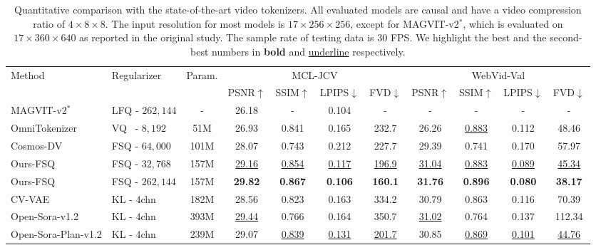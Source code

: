 \documentclass{article} %
\begin{document}
\begin{table}[t]
\begin{center}
\footnotesize
\caption{Quantitative comparison with the state-of-the-art video tokenizers.
All evaluated models are causal and have a video compression ratio of $4\times 8\times 8$.
The input resolution for most models is $17 \times 256 \times 256$, except for MAGVIT-v2$^*$, which is evaluated on $17 \times 360 \times 640$ as reported in the original study.
The sample rate of testing data is 30 FPS.
We highlight the best and the second-best numbers in \textbf{bold} and \underline{underline} respectively.
}
    \setlength\tabcolsep{3pt}
    \renewcommand\arraystretch{1.1}
    \begin{tabular}{l|l|c|cccc|cccc}
    \toprule[1.5pt]
    \multirow{2}{*}{Method} & \multirow{2}{*}{Regularizer}  & \multirow{2}{*}{Param.}  & \multicolumn{4}{c}{MCL-JCV} & \multicolumn{4}{c}{WebVid-Val} \\
    \cmidrule(l){4-7}
    \cmidrule(l){8-11}
     &   &  & PSNR$\uparrow$ & SSIM$\uparrow$ & LPIPS$\downarrow$ & FVD$\downarrow$ & PSNR$\uparrow$ & SSIM$\uparrow$ & LPIPS$\downarrow$ & FVD$\downarrow$ \\
    \midrule 
    MAGVIT-v2$^*$  & LFQ - $262,144$   & - & 26.18 & - & 0.104 &-&-&- &-&- \\
    OmniTokenizer & VQ \, - $8,192$ & 51M & 26.93 & 0.841 & 0.165 & 232.7 & 26.26 & \underline{0.883}& 0.112 & 48.46 \\
    Cosmos-DV & FSQ - $64,000$ & 101M & 28.07 & 0.743 & 0.212 &227.7 & 29.39 & 0.741& 0.170& 57.97\\
    Ours-FSQ & FSQ - $32,768$ &  157M & \underline{29.16} & \underline{0.854} & \underline{0.117} & \underline{196.9} & \underline{31.04} & \underline{0.883} & \underline{0.089} & \underline{45.34} \\
    Ours-FSQ & FSQ - $262,144$ & 157M& \textbf{29.82} & \textbf{0.867} & \textbf{0.106} & \textbf{160.1} & \textbf{31.76} & \textbf{0.896} & \textbf{0.080} & \textbf{38.17} \\   
    \midrule
    CV-VAE  & KL - $4$chn  &  182M & 28.56 & 0.823 & 0.163 & 334.2& 30.79 & 0.863& 0.116& 70.39\\
      Open-Sora-v1.2  & KL - $4$chn  & 393M  & \underline{29.44} & 0.766 & 0.164 & 350.7 & \underline{31.02} & 0.764 & 0.137 & 112.34 \\
    Open-Sora-Plan-v1.2  & KL - $4$chn & 239M & 29.07 & \underline{0.839} & \underline{0.131} & \underline{201.7} & 30.85 & \underline{0.869} & \underline{0.101} & \underline{44.76} \\

\end{tabular}
\end{center}
\end{table}
\end{document}
